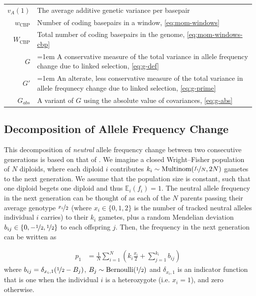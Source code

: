 \documentclass[11pt]{article}
\newcommand{\E}{\mathbb{E}}
\begin{document}
\begin{table}[!htbp]
\begin{tabular}{r|p{12cm}}
 $v_A(1)$ & The average additive genetic variance per basepair \\
 $w_{\text{CBP}}$ & Number of coding basepairs in a window, \eqref{eq:mom-windows} \\
 $W_{\text{CBP}}$ & Total number of coding basepairs in the genome, \eqref{eq:mom-windows-cbp}  \\
   $G$ & \hangindent=1em A conservative measure of the total variance in allele frequency change due to linked selection, \eqref{eq:g-def} \\
   $G'$ & \hangindent=1em An alterate, less conservative measure of the total variance in allele frequnecy change due to linked selection, \eqref{eq:g-prime} \\
   $G_{abs}$ & A variant of $G$ using the absolute value of covariances, \eqref{eq:g-abs} \\
\end{tabular}
\end{table}

\subsection{Decomposition of Allele Frequency Change}
\label{ap:decomp}

This decomposition of \emph{neutral} allele frequency change between two
consecutive generations is based on that of \textcite{Santiago1995-hx}. We
imagine a closed Wright--Fisher population of $N$ diploids, where each diploid
$i$ contributes $k_i \sim \text{Multinom}(\nicefrac{f_i}{N}, 2N)$ gametes to
the next generation. We assume that the population size is constant, such that one
diploid begets one diploid and thus $\E_i(f_i) = 1$. The neutral allele
frequency in the next generation can be thought of as each of the $N$ parents
passing their average genotype $\nicefrac{x_i}{2}$ (where $x_i \in\{0, 1, 2\}$
is the number of tracked neutral alleles individual $i$ carries) to their $k_i$
gametes, plus a random Mendelian deviation $b_{ij} \in \{0, -\nicefrac{1}{2},
\nicefrac{1}{2}\}$ to each offspring $j$. Then, the frequency in the next
generation can be written as

\begin{align}
  p_1 &= \frac{1}{N} \sum_{i=1}^N \left(k_i \frac{x_i}{2} + \sum_{j=1}^{k_i} b_{ij} \right)
  \label{eq:ap-freq}
\end{align}
%
where $b_{ij} = \delta_{x_i, 1} (\nicefrac{1}{2} - B_j)$, $B_j \sim
\text{Bernoulli}(\nicefrac{1}{2})$ and $\delta_{x_i, 1}$ is an indicator
function that is one when the individual $i$ is a heterozygote (i.e. $x_i=1$),
and zero otherwise.
\end{document}
